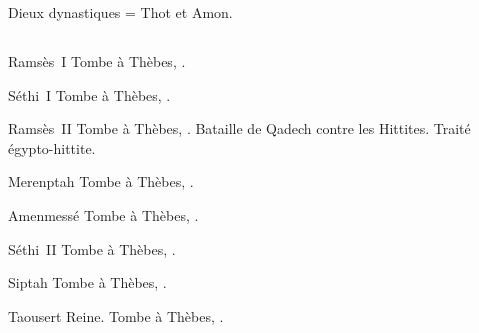 Dieux dynastiques = Thot et Amon.

\subsection{\texorpdfstring{}{XIXe dynastie}}


\begin{listerois}
  \item [Ramsès~I\ier \datation{(c.~\anorange{1292}{1290})}] 
        Tombe à Thèbes, . 
  \item [Séthi~I\ier \datation{(c.~\anorange{1290}{1279})}] 
        Tombe à Thèbes, . 
  \item [Ramsès~II \datation{(c.~\anorange{1279}{1213})}] 
        Tombe à Thèbes, . Bataille de Qadech contre les 
        Hittites. Traité égypto-hittite.
  \item [Merenptah \datation{(c.~\anorange{1213}{1203})}] 
        Tombe à Thèbes, . 
  \item [Amenmessé \datation{(c.~\anorange{1203}{1199})}] 
        Tombe à Thèbes, . 
  \item [Séthi~II \datation{(c.~\anorange{1199}{1193})}] 
        Tombe à Thèbes, . 
  \item [Siptah \datation{(c.~\anorange{1193}{1187})}] 
        Tombe à Thèbes, . 
  \item [Taousert \datation{(c.~\anorange{1187}{1185})}] Reine.
        Tombe à Thèbes, . 
\end{listerois}

\subsection{\texorpdfstring{}{XXe dynastie}}


